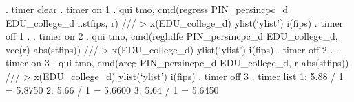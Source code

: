 . timer clear
{\smallskip}
. timer on 1
{\smallskip}
. qui tmo, cmd(regress PIN_persincpc_d EDU_college_d i.stfips, r) ///
>     x(EDU_college_d) ylist(`ylist') i(fips)
{\smallskip}
. timer off 1
{\smallskip}
. 
. timer on 2
{\smallskip}
. qui tmo, cmd(reghdfe PIN_persincpc_d EDU_college_d, vce(r) abs(stfips)) ///
>     x(EDU_college_d) ylist(`ylist') i(fips)
{\smallskip}
. timer off 2
{\smallskip}
. 
. timer on 3
{\smallskip}
. qui tmo, cmd(areg PIN_persincpc_d EDU_college_d, r abs(stfips)) ///
>     x(EDU_college_d) ylist(`ylist') i(fips)
{\smallskip}
. timer off 3
{\smallskip}
. timer list
   1:      5.88 /        1 =       5.8750
   2:      5.66 /        1 =       5.6600
   3:      5.64 /        1 =       5.6450
{\smallskip}
